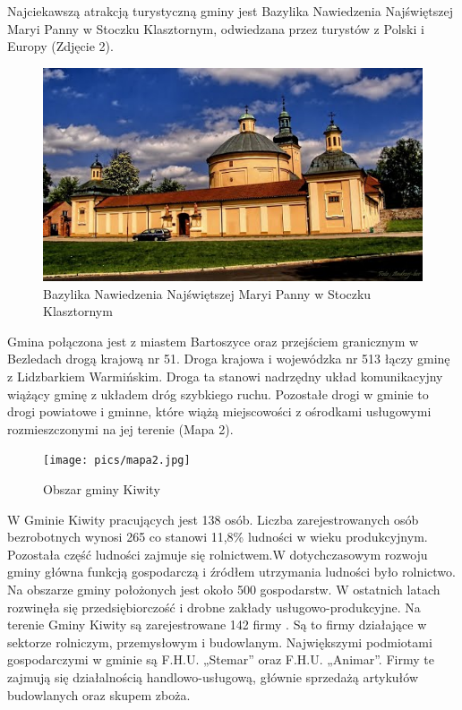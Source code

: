 \documentclass[a4paper,10pt]{article}
\begin{document}
    Najciekawszą atrakcją turystyczną gminy jest Bazylika Nawiedzenia Najświętszej Maryi Panny w Stoczku Klasztornym, odwiedzana przez turystów z Polski i Europy (Zdjęcie 2).
    \begin{figure}[!htb]
    \centering
	\includegraphics[scale=0.5]{pics/zdjecie2.jpg}
	\caption{Bazylika Nawiedzenia Najświętszej Maryi Panny w Stoczku Klasztornym}
    \end{figure}
    
    Gmina połączona jest z miastem Bartoszyce oraz przejściem granicznym w Bezledach drogą krajową nr 51. 
    Droga krajowa i  wojewódzka nr 513 łączy gminę z Lidzbarkiem Warmińskim. Droga ta stanowi nadrzędny układ komunikacyjny wiążący gminę z układem dróg szybkiego ruchu. 
    Pozostałe drogi w gminie to drogi powiatowe i gminne, które wiążą miejscowości z ośrodkami usługowymi rozmieszczonymi na jej terenie (Mapa 2).
    \begin{figure}[!htb]
    \centering
	\texttt{[image: pics/mapa2.jpg]}
	\caption{Obszar gminy Kiwity}
    \end{figure}
    \newpage
    W Gminie Kiwity pracujących jest 138 osób. Liczba zarejestrowanych osób bezrobotnych wynosi 265 co stanowi 11,8\% ludności w wieku produkcyjnym. 
    Pozostała część ludności zajmuje się rolnictwem.W dotychczasowym rozwoju gminy główna funkcją gospodarczą i źródłem utrzymania ludności było rolnictwo. 
    Na obszarze gminy położonych jest około 500 gospodarstw. W ostatnich latach rozwinęła się przedsiębiorczość i drobne zakłady usługowo-produkcyjne. 
    Na terenie Gminy Kiwity są zarejestrowane 142 firmy . Są to firmy działające w sektorze rolniczym, przemysłowym i budowlanym. 
    Największymi podmiotami gospodarczymi w gminie są F.H.U. „Stemar” oraz F.H.U. „Animar”. 
    Firmy te zajmują się działalnością handlowo-usługową, głównie sprzedażą artykułów budowlanych oraz skupem zboża.
\end{document}

